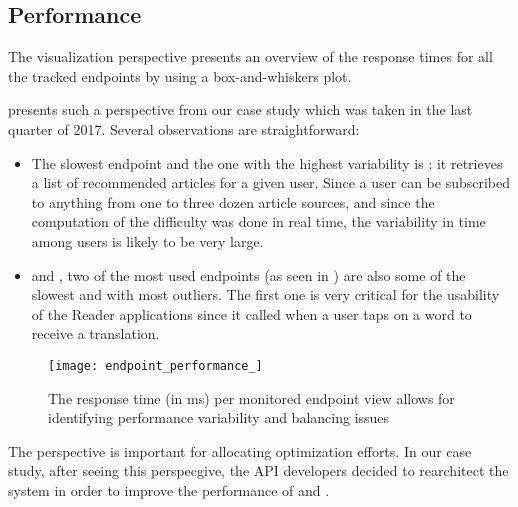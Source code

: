 
\subsection{Performance}
\label{sec:perf}

The  visualization perspective presents
an overview of the response times for all the tracked endpoints 
by using a box-and-whiskers plot. 

 presents such a perspective from our case study which 
was taken in the last quarter of 2017. Several observations are 
straightforward: 

\begin{itemize}

  \item The slowest endpoint and the one with the highest variability is \epFeedItemsColor: it retrieves a list of recommended articles for a given user. Since a user can be subscribed to anything from one to three dozen article sources, and since the computation of the difficulty was done in real time, the variability in time among users is likely to be very large. 

  \item \epTranslationsColor and \epBookmarksToStudyColor, two of the most used endpoints (as seen in ) are also some of the slowest and with most outliers. The first one is very critical for the usability of the Reader applications since it called when a user taps on a word to receive a translation.
 
\end{itemize}

\begin{figure}
 \centering
 \texttt{[image: endpoint\_performance\_]}
 \caption{The response time (in ms) per monitored endpoint view allows for identifying performance variability and balancing issues}
 \label{fig:ep}
\end{figure}

The  perspective is important for allocating optimization efforts. In our case study, after seeing this perspecgive, the API developers decided to rearchitect the system in order to improve the performance of \epTranslations and \epFeedItems. 








